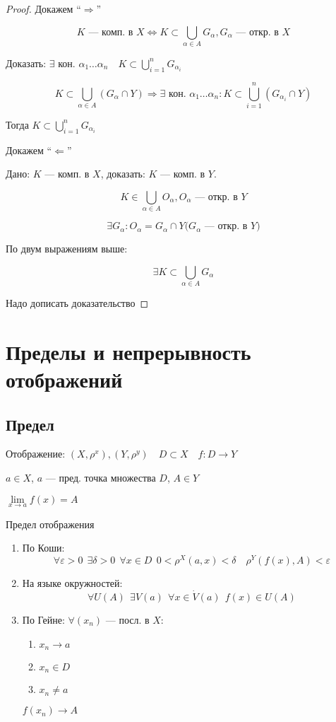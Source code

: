 \begin{proof}
    Докажем ``$\Rightarrow$''

    $$K\text{ --- комп. в }X \Leftrightarrow K\subset\bigcup\limits_{\alpha\in A} G_\alpha, G_\alpha\text{ --- откр. в } X$$

    Доказать: $\exists$ кон. $\alpha_1\ldots\alpha_n \quad K\subset\bigcup\limits_{i=1}^n G_{\alpha_i}$

    $$K\subset\bigcup\limits_{\alpha\in A}(G_\alpha\cap Y) \Rightarrow \exists\text{ кон. } \alpha_1\ldots\alpha_n: K\subset \bigcup\limits_{i=1}^n(G_{\alpha_i}\cap Y)$$

    Тогда $K\subset \bigcup\limits_{i=1}^n G_{\alpha_i}$

    Докажем ``$\Leftarrow$''

    Дано: $K$ --- комп. в $X$, доказать: $K$ --- комп. в $Y$.

    $$K\in\bigcup\limits_{\alpha\in A} O_\alpha, O_\alpha\text{ --- откр. в }Y$$

    $$\exists G_\alpha : O_\alpha=G_\alpha\cap Y\textit{($G_\alpha$ --- откр. в $Y$)}$$

    По двум выражениям выше:

    $$\exists K\subset \bigcup\limits_{\alpha\in A} G_\alpha$$


    Надо дописать доказательство
\end{proof}

\section{Пределы и непрерывность отображений}

\subsection{Предел}

Отображение: $(X, \rho^x), (Y, \rho^y) \quad D\subset X \quad f:D\to Y$

$a\in X$, $a$ --- пред. точка множества $D$, $A\in Y$

$\lim\limits_{x\to a}f(x)=A$

\begin{definition}
    Предел отображения
    \begin{enumerate}
    \item По Коши:
    $$\forall \varepsilon>0 \ \ \exists \delta>0 \ \ \forall x\in D \ \ 0<\rho^X(a,x)<\delta \quad \rho^Y(f(x), A) < \varepsilon$$
    \item На языке окружностей:
    $$\forall U(A) \ \ \exists V(a) \ \ \forall x\in \dot V(a) \ \ f(x)\in U(A)$$
    \item По Гейне: $\forall (x_n)$ --- посл. в $X$:
    \begin{enumerate}
        \item $x_n\to a$
        \item $x_n\in D$
        \item $x_n\not = a$
    \end{enumerate}
    $f(x_n)\to A$
    \end{enumerate}
\end{definition}

